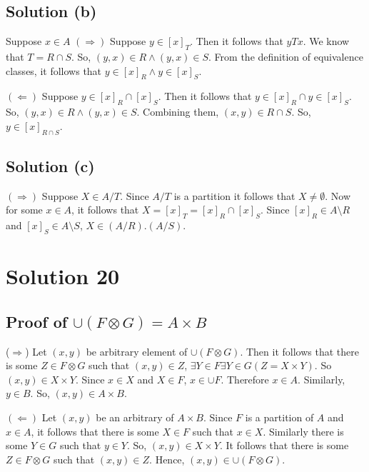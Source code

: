 \documentclass{article}
\begin{document}
\subsection{Solution (b)}
Suppose $x \in A$
$(\Rightarrow)$ Suppose $y \in [x]_T$. Then it follows that $yTx$. We
know that $T = R \cap S$. So, $(y,x) \in R \land (y,x) \in S$. From
the definition of equivalence classes, it follows that $y \in [x]_R
\land y \in [x]_S$.

$(\Leftarrow)$ Suppose $y \in [x]_R \cap [x]_S$. Then it follows that
$y \in [x]_R \cap y \in [x]_S$. So, $(y,x) \in R \land (y,x) \in S$.
Combining them, $(x,y) \in R \cap S$. So, $y \in [x]_{R \cap S}$.

\subsection{Solution (c)}
$(\Rightarrow)$ Suppose $X \in A/T$. Since $A/T$ is a partition it
follows that $X \neq \emptyset$. Now for some $x \in A$, it follows
that $X = [x]_T = [x]_R \cap [x]_S$. Since $[x]_R \in A \setminus R$
and $[x]_S \in A \setminus S$, $X \in (A/R).(A/S)$.

\section{Solution 20}
\subsection{Proof of $\cup(F \otimes G) = A \times B$}

($\Rightarrow$) Let $(x,y)$ be arbitrary element of
$\cup(F \otimes G)$. Then it follows that there is some
$Z \in F \otimes G$ such that $(x,y) \in Z$,
$\exists Y \in F \exists Y \in G (Z = X \times Y)$. So
$(x,y) \in X \times Y$. Since $x \in X$ and $X \in F$, $x \in \cup F$.
Therefore $x \in A$. Similarly, $y \in B$. So, $(x,y) \in A \times B$.

$(\Leftarrow)$ Let $(x,y)$ be an arbitrary of $A \times B$. Since $F$
is a partition of $A$ and $x \in A$, it follows that there is some $X
\in F$ such that $x \in X$. Similarly there is some $Y \in G$ such
that $y \in Y$. So, $(x,y) \in X \times Y$. It follows that there is
some $Z \in F \otimes G$ such that $(x,y) \in Z$. Hence, $(x,y) \in
\cup(F \otimes G)$.
\end{document}
